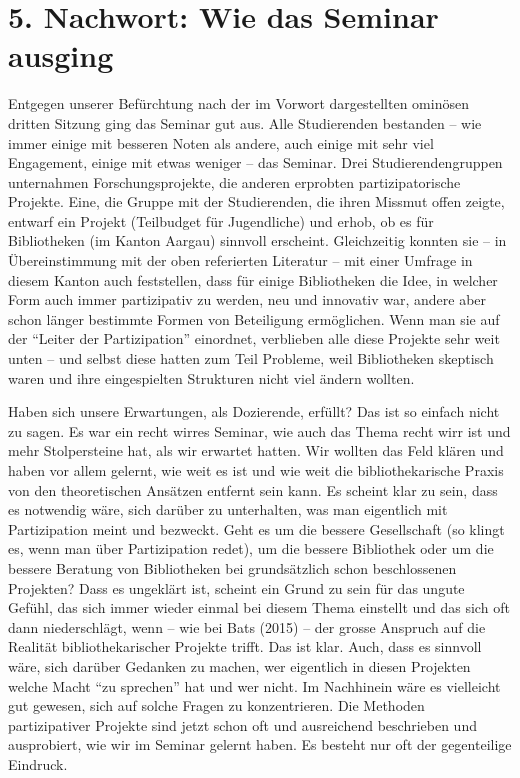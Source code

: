 \documentclass[a4paper,
fontsize=11pt,
oneside,
numbers=noperiodatend,
parskip=half-,
bibliography=totoc,
final
]{scrartcl}
\begin{document}
\hypertarget{nachwort-wie-das-seminar-ausging}{%
\section{5. Nachwort: Wie das Seminar
ausging}\label{nachwort-wie-das-seminar-ausging}}

Entgegen unserer Befürchtung nach der im Vorwort dargestellten ominösen
dritten Sitzung ging das Seminar gut aus. Alle Studierenden bestanden --
wie immer einige mit besseren Noten als andere, auch einige mit sehr
viel Engagement, einige mit etwas weniger -- das Seminar. Drei
Studierendengruppen unternahmen Forschungsprojekte, die anderen
erprobten partizipatorische Projekte. Eine, die Gruppe mit der
Studierenden, die ihren Missmut offen zeigte, entwarf ein Projekt
(Teilbudget für Jugendliche) und erhob, ob es für Bibliotheken (im
Kanton Aargau) sinnvoll erscheint. Gleichzeitig konnten sie -- in
Übereinstimmung mit der oben referierten Literatur -- mit einer Umfrage
in diesem Kanton auch feststellen, dass für einige Bibliotheken die
Idee, in welcher Form auch immer partizipativ zu werden, neu und
innovativ war, andere aber schon länger bestimmte Formen von Beteiligung
ermöglichen. Wenn man sie auf der \enquote{Leiter der Partizipation}
einordnet, verblieben alle diese Projekte sehr weit unten -- und selbst
diese hatten zum Teil Probleme, weil Bibliotheken skeptisch waren und
ihre eingespielten Strukturen nicht viel ändern wollten.

Haben sich unsere Erwartungen, als Dozierende, erfüllt? Das ist so
einfach nicht zu sagen. Es war ein recht wirres Seminar, wie auch das
Thema recht wirr ist und mehr Stolpersteine hat, als wir erwartet
hatten. Wir wollten das Feld klären und haben vor allem gelernt, wie
weit es ist und wie weit die bibliothekarische Praxis von den
theoretischen Ansätzen entfernt sein kann. Es scheint klar zu sein, dass
es notwendig wäre, sich darüber zu unterhalten, was man eigentlich mit
Partizipation meint und bezweckt. Geht es um die bessere Gesellschaft
(so klingt es, wenn man über Partizipation redet), um die bessere
Bibliothek oder um die bessere Beratung von Bibliotheken bei
grundsätzlich schon beschlossenen Projekten? Dass es ungeklärt ist,
scheint ein Grund zu sein für das ungute Gefühl, das sich immer wieder
einmal bei diesem Thema einstellt und das sich oft dann niederschlägt,
wenn -- wie bei Bats (2015) -- der grosse Anspruch auf die Realität
bibliothekarischer Projekte trifft. Das ist klar. Auch, dass es sinnvoll
wäre, sich darüber Gedanken zu machen, wer eigentlich in diesen
Projekten welche Macht \enquote{zu sprechen} hat und wer nicht. Im
Nachhinein wäre es vielleicht gut gewesen, sich auf solche Fragen zu
konzentrieren. Die Methoden partizipativer Projekte sind jetzt schon oft
und ausreichend beschrieben und ausprobiert, wie wir im Seminar gelernt
haben. Es besteht nur oft der gegenteilige Eindruck.
\end{document}
